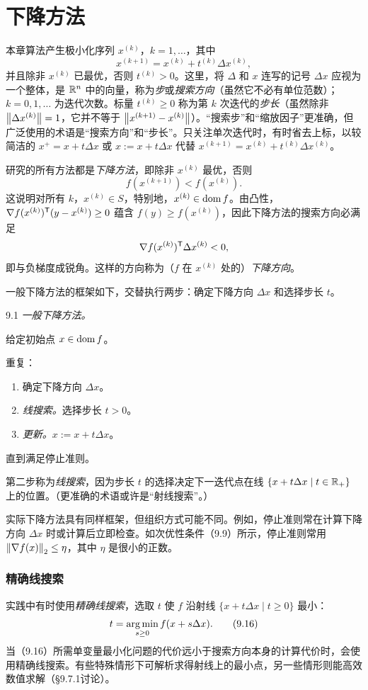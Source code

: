 \section{下降方法}
本章算法产生极小化序列 $x^{(k)}$，$k=1,\ldots$，其中
\[
x^{(k+1)}=x^{(k)}+t^{(k)}\Delta x^{(k)},
\]
并且除非 $x^{(k)}$ 已最优，否则 $t^{(k)}>0$。这里，将 $\Delta$ 和 $x$ 连写的记号 $\Delta x$ 应视为一个整体，是 $\mathbb R^n$ 中的向量，称为\emph{步}或\emph{搜索方向}（虽然它不必有单位范数）；$k=0,1,\ldots$ 为迭代次数。标量 $t^{(k)}\ge0$ 称为第 $k$ 次迭代的\emph{步长}（虽然除非 $\left\lVert \Delta x^{(k)}\right\rVert=1$，它并不等于 $\left\lVert x^{(k+1)}-x^{(k)}\right\rVert$）。“搜索步”和“缩放因子”更准确，但广泛使用的术语是“搜索方向”和“步长”。只关注单次迭代时，有时省去上标，以较简洁的 $x^+=x+t\Delta x$ 或 $x:=x+t\Delta x$ 代替 $x^{(k+1)}=x^{(k)}+t^{(k)}\Delta x^{(k)}$。

研究的所有方法都是\emph{下降方法}，即除非 $x^{(k)}$ 最优，否则
\[
f(x^{(k+1)})<f(x^{(k)}).
\]
这说明对所有 $k$，$x^{(k)}\in S$，特别地，$x^{(k)}\in\operatorname{dom} f$。由凸性，$\nabla f(x^{(k)})^\mathsf T(y-x^{(k)})\ge0$ 蕴含 $f(y)\ge f(x^{(k)})$，因此下降方法的搜索方向必满足
\[
\nabla f(x^{(k)})^\mathsf T\Delta x^{(k)}<0,
\]
即与负梯度成锐角。这样的方向称为（$f$ 在 $x^{(k)}$ 处的）\emph{下降方向}。

一般下降方法的框架如下，交替执行两步：确定下降方向 $\Delta x$ 和选择步长 $t$。

\begin{origalgorithm}{9.1}
\emph{一般下降方法。}

给定初始点 $x\in\operatorname{dom} f$。

重复：
\begin{enumerate}
\item 确定下降方向 $\Delta x$。
\item \emph{线搜索。}选择步长 $t>0$。
\item \emph{更新。}$x:=x+t\Delta x$。
\end{enumerate}
直到满足停止准则。
\end{origalgorithm}

第二步称为\emph{线搜索}，因为步长 $t$ 的选择决定下一迭代点在线 $\{x+t\Delta x\mid t\in\mathbb R_+\}$ 上的位置。（更准确的术语或许是“射线搜索”。）

实际下降方法具有同样框架，但组织方式可能不同。例如，停止准则常在计算下降方向 $\Delta x$ 时或计算后立即检查。如次优性条件（9.9）所示，停止准则常用 $\left\lVert \nabla f(x)\right\rVert_2\le\eta$，其中 $\eta$ 是很小的正数。

\subsubsection*{精确线搜索}
实践中有时使用\emph{精确线搜索}，选取 $t$ 使 $f$ 沿射线 $\{x+t\Delta x\mid t\ge0\}$ 最小：
\begin{equation}
t=\operatorname*{arg\,min}_{s\ge0}f(x+s\Delta x).\tag{9.16}
\end{equation}
当（9.16）所需单变量最小化问题的代价远小于搜索方向本身的计算代价时，会使用精确线搜索。有些特殊情形下可解析求得射线上的最小点，另一些情形则能高效数值求解（§9.7.1讨论）。

